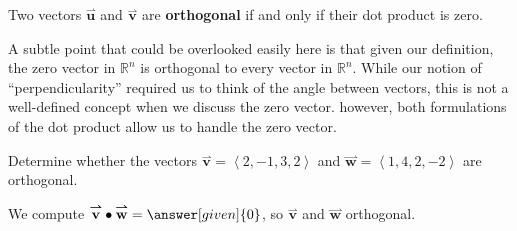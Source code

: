 \documentclass{ximera}
\begin{document}
\begin{definition}
  Two vectors $\overset{\boldsymbol{\rightharpoonup}}{\mathbf{u}}$ and $\overset{\boldsymbol{\rightharpoonup}}{\mathbf{v}}$ are \textbf{orthogonal} if and only if their dot product is zero. 
\end{definition}

A subtle point that could be overlooked easily here is that given our definition, the zero vector in $\mathbb{R}^n$ is orthogonal to every vector in $\mathbb{R}^n$.  While our notion of ``perpendicularity'' required us to think of the angle between vectors, this is not a well-defined concept when we discuss the zero vector.  however, both formulations of the dot product allow us to handle the zero vector.



\begin{example}
Determine whether the vectors $\overset{\boldsymbol{\rightharpoonup}}{\mathbf{v}} = \left< 2,-1,3,2 \right>$ and $\overset{\boldsymbol{\rightharpoonup}}{\mathbf{w}} = \left< 1,4,2,-2 \right>$ are orthogonal.

\begin{explanation}
We compute $\overset{\boldsymbol{\rightharpoonup}}{\mathbf{v}} \bullet \overset{\boldsymbol{\rightharpoonup}}{\mathbf{w}} = \answer[given]{0}$, so $\overset{\boldsymbol{\rightharpoonup}}{\mathbf{v}}$ and $\overset{\boldsymbol{\rightharpoonup}}{\mathbf{w}}$  orthogonal.
\end{explanation}
\end{example}
\end{document}
